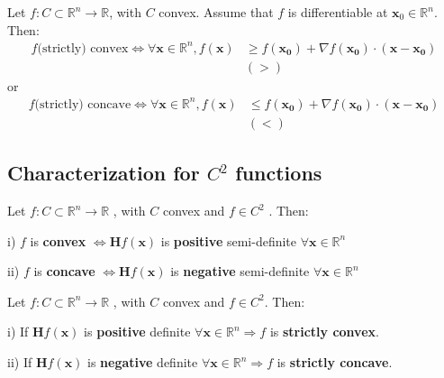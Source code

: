 \begin{proposition}
    Let \(f: C \subset \mathbb{R}^{n} \rightarrow \mathbb{R}\), with \(C\) convex. Assume that \(f\) is differentiable at \(\mathbf{x}_{0} \in \mathbb{R}^{n}\). Then:
    \begin{align*}
        f \text{(strictly) convex} \iff \forall \mathbf{x} \in \mathbb{R}^{n}, f(\mathbf{x}) & \geq f(\mathbf{x_0}) + \nabla f(\mathbf{x_0}) \cdot (\mathbf{x} - \mathbf{x_0}) \\
                                                                                             & (>)
    \end{align*}
    or
    \begin{align*}
        f \text{(strictly) concave} \iff \forall \mathbf{x} \in \mathbb{R}^{n}, f(\mathbf{x}) & \leq f(\mathbf{x_0}) + \nabla f(\mathbf{x_0}) \cdot (\mathbf{x} - \mathbf{x_0}) \\
                                                                                              & (<)
    \end{align*}
\end{proposition}

\subsection{Characterization for \(C^2\) functions}

\begin{proposition}
    Let \(f:C\subset \mathbb{R}^{n}\longrightarrow \mathbb{R}\) , with \(C\) convex and \(f\in C^{2}\) . Then:

    i) \(f\) is \textbf{convex} \(\iff \mathbf{H}f(\mathbf{x})\) is \textbf{positive} semi-definite \(\forall \mathbf{x}\in \mathbb{R}^{n}\)

    ii) \(f\) is \textbf{concave} \(\iff \mathbf{H}f(\mathbf{x})\) is \textbf{negative} semi-definite \(\forall \mathbf{x}\in \mathbb{R}^{n}\)
\end{proposition}

\begin{proposition}
    Let \(f:C\subset \mathbb{R}^{n}\longrightarrow \mathbb{R}\) , with \(C\) convex and \(f\in C^{2}\). Then:

    i) If \(\mathbf{H}f(\mathbf{x})\) is \textbf{positive} definite \(\forall \mathbf{x}\in \mathbb{R}^{n} \Longrightarrow f\) is \textbf{strictly convex}.

    ii) If \(\mathbf{H}f(\mathbf{x})\) is \textbf{negative} definite \(\forall \mathbf{x}\in \mathbb{R}^{n} \Longrightarrow f\) is \textbf{strictly concave}.
\end{proposition}

